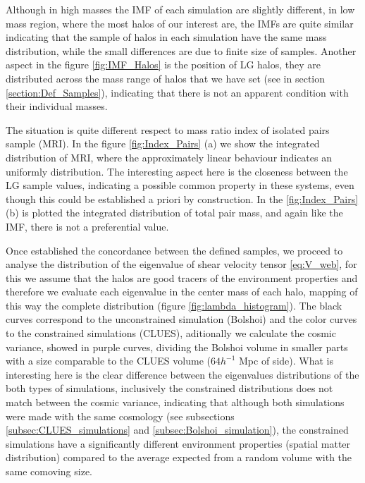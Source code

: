 \documentclass[usenatbib]{latex/mn2e}
\begin{document}
Although in high masses the IMF of each simulation are slightly different, 
in low mass region, where the most halos of our interest are, the IMFs are 
quite similar indicating that the sample of halos in each simulation have 
the same mass distribution, while the small differences are due to finite 
size of samples. Another aspect in the figure \ref{fig:IMF_Halos} is the 
position of LG halos, they are distributed across the mass range of halos 
that we have set (see in section \ref{section:Def_Samples}), indicating 
that there is not an apparent condition with their individual masses.



The situation is quite different respect to mass ratio index of isolated 
pairs sample (MRI). In the figure \ref{fig:Index_Pairs} (a) we show the 
integrated distribution of MRI, where the approximately linear behaviour 
indicates an uniformly distribution. The interesting aspect here is the 
closeness between the LG sample values, indicating a possible common 
property in these systems, even though this could be established a priori 
by construction. In the \ref{fig:Index_Pairs} (b) is plotted the 
integrated distribution of total pair mass, and again like the IMF, there 
is not a preferential value.



Once established the concordance between the defined samples, we proceed 
to analyse the distribution of the eigenvalue of shear velocity tensor 
\ref{eq:V_web}, for this we assume that the halos are good tracers of the 
environment properties and therefore we evaluate each eigenvalue in the 
center mass of each halo, mapping of this way the complete distribution 
(figure \ref{fig:lambda_histogram}). The black curves correspond to the 
unconstrained simulation (Bolshoi) and the color curves to the constrained 
simulations (CLUES), aditionally we calculate the cosmic variance, showed 
in purple curves, dividing the Bolshoi volume in smaller parts with a size 
comparable to the CLUES volume ($64 h^{-1 }$ Mpc of side). What is 
interesting here is the clear difference between the eigenvalues 
distributions of the both types of simulations, inclusively the 
constrained distributions does not match between the cosmic variance, 
indicating that although both simulations were made with the same cosmology 
(see subsections \ref{subsec:CLUES_simulations} and 
\ref{subsec:Bolshoi_simulation}), the constrained simulations have a 
significantly different environment properties (spatial matter distribution) 
compared to the average expected from a random volume with the same 
comoving size.
\end{document}
